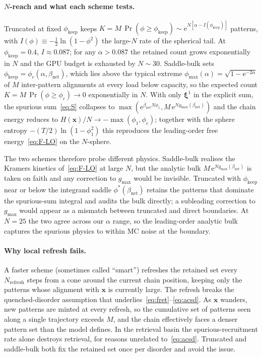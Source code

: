\documentclass[11pt]{article}
\newcommand{\bxi}{\boldsymbol{\xi}}
\newcommand{\bx}{\bm{x}}
\newcommand{\e}{{\mathrm{e}}}
\newcommand{\Bnet}{\beta_{\mathrm{net}}}
\newcommand{\gmax}{g_{\max}}
\begin{document}
\paragraph{$N$-reach and what each scheme tests.}
Truncated at fixed $\phi_{\mathrm{keep}}$ keeps
$K = M\,\Pr(\phi \ge \phi_{\mathrm{keep}}) \sim
\e^{N[\alpha - I(\phi_{\mathrm{keep}})]}$ patterns, with
$I(\phi) \equiv -\tfrac12 \ln(1 - \phi^2)$ the large-$N$ rate of
the spherical tail.  At $\phi_{\mathrm{keep}} = 0.4$,
$I \approx 0.087$; for any $\alpha > 0.087$ the retained count grows
exponentially in $N$ and the GPU budget is exhausted by $N \sim 30$.
Saddle-bulk sets $\phi_{\mathrm{keep}} = \phi_c(\alpha, \Bnet)$, which
lies above the typical extreme
$\phi_{\max}(\alpha) = \sqrt{1 - \e^{-2\alpha}}$ of $M$ inter-pattern
alignments at every load below capacity, so the expected count
$K = M\,\Pr(\phi \ge \phi_c) \to 0$ exponentially in $N$.  With
only $\bxi^1$ in the explicit sum, the spurious sum~\eqref{eq:S}
collapses to $\max(\e^{\Bnet N \phi_1}, M\,\e^{N\gmax(\Bnet)})$ and the
chain energy reduces to $H(\bx)/N \to -\max(\phi_1, \phi_c)$;
together with the sphere entropy $-(T/2)\ln(1 - \phi_1^2)$ this
reproduces the leading-order free energy~\eqref{eq:F-LO} on the
$N$-sphere.

The two schemes therefore probe different physics.  Saddle-bulk realises
the Kramers kinetics of~\eqref{eq:F-LO} at large $N$, but the analytic
bulk $M\,\e^{N\gmax(\Bnet)}$ is taken on faith and any correction to
$\gmax$ would be invisible.  Truncated with $\phi_{\mathrm{keep}}$
near or below the integrand saddle $\phi^{*}(\Bnet)$ retains the
patterns that dominate the spurious-sum integral and audits the bulk
directly; a subleading correction to $\gmax$ would appear as a
mismatch between truncated and direct boundaries.  At $N = 25$ the two
agree across our $\alpha$ range, so the leading-order analytic bulk
captures the spurious physics to within MC noise at the boundary.

\paragraph{Why local refresh fails.}
A faster scheme (sometimes called ``smart'') refreshes the retained
set every $N_{\mathrm{refresh}}$ steps from a cone around the current
chain position, keeping only the patterns whose alignment with $\bx$ is
currently large.  The refresh breaks the quenched-disorder assumption
that underlies~\eqref{eq:fret}--\eqref{eq:acsd}.  As $\bx$ wanders, new
patterns are minted at every refresh, so the cumulative set of patterns
seen along a single trajectory exceeds $M$, and the chain effectively
faces a denser pattern set than the model defines.  In the retrieval
basin the spurious-recruitment rate alone destroys retrieval, for
reasons unrelated to~\eqref{eq:acsd}.  Truncated and saddle-bulk both fix the
retained set once per disorder and avoid the issue.
\end{document}
